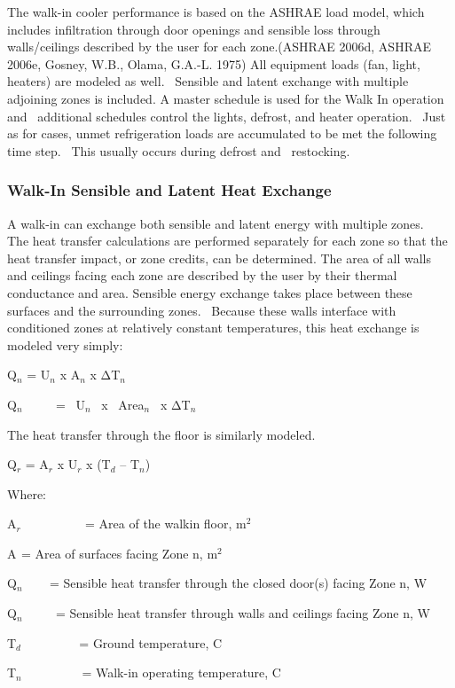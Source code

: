 The walk-in cooler performance is based on the ASHRAE load model, which includes infiltration through door openings and sensible loss through walls/ceilings described by the user for each zone.(ASHRAE 2006d, ASHRAE 2006e, Gosney, W.B., Olama, G.A.-L. 1975) All equipment loads (fan, light, heaters) are modeled as well.~ Sensible and latent exchange with multiple adjoining zones is included. A master schedule is used for the Walk In operation and~ additional schedules control the lights, defrost, and heater operation. ~Just as for cases, unmet refrigeration loads are accumulated to be met the following time step.~ This usually occurs during defrost and ~restocking.

\subsubsection{Walk-In Sensible and Latent Heat Exchange}\label{walk-in-sensible-and-latent-heat-exchange}

A walk-in can exchange both sensible and latent energy with multiple zones.~ The heat transfer calculations are performed separately for each zone so that the heat transfer impact, or zone credits, can be determined. The area of all walls and ceilings facing each zone are described by the user by their thermal conductance and area. Sensible energy exchange takes place between these surfaces and the surrounding zones.~ Because these walls interface with conditioned zones at relatively constant temperatures, this heat exchange is modeled very simply:

Q\(_{n}\) = U\(_{n}\) x A\(_{n}\) x ΔT\(_{n}\)

Q\(_{n}\) ~~~~ = ~U\(_{n}\)~ x~ Area\(_{n}\) ~x ΔT\(_{n}\)

The heat transfer through the floor is similarly modeled.

Q\(_{r}\) = A\(_{r}\) x U\(_{r}\) x (T\(_{d}\) -- T\(_{n}\))

Where:

A\(_{r}\) ~~~~~~~~~ = Area of the walkin floor, m\(^{2}\)

A\(_{ }\) = Area of surfaces facing Zone n, m\(^{2}\)

Q\(_{n}\) ~~~ = Sensible heat transfer through the closed door(s) facing Zone n, W

Q\(_{n}\) ~~~~ = Sensible heat transfer through walls and ceilings facing Zone n, W

T\(_{d}\) ~~~~~~~~ = Ground temperature, C

T\(_{n}\)~~~~~~~~~ = Walk-in operating temperature, C

